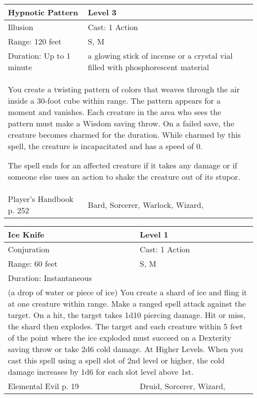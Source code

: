 \documentclass[11pt]{report}
\begin{document}
\begin{table}[H]
	\begin{tabular}{||p{6cm}|p{6cm}||}
		\hline\hline
		\bf{Hypnotic Pattern} & Level 3\\ \hline
		Illusion & Cast: 1 Action\\ \hline
		Range: 120 feet & S, M\\ \hline
		Duration: Up to 1 minute & a glowing stick of incense or a crystal vial filled with phosphorescent material\\ \hline
		\multicolumn{2}{||p{12cm}||}{You create a twisting pattern of colors that weaves through the air inside a 30-foot cube within range.
The pattern appears for a moment and vanishes. Each creature in the area who sees the pattern must make a Wisdom saving throw. On a failed save, the creature becomes charmed for the duration. While charmed by this spell, the creature is incapacitated and has a speed of 0.

The spell ends for an affected creature if it takes any damage or if someone else uses an action to shake the creature out of its stupor.}\\ \hline
Player's Handbook p. 252 & Bard, Sorcerer, Warlock, Wizard, \\ \hline\hline
	\end{tabular}
\end{table}

\begin{table}[H]
	\begin{tabular}{||p{6cm}|p{6cm}||}
		\hline\hline
		\bf{Ice Knife} & Level 1\\ \hline
		Conjuration & Cast: 1 Action\\ \hline
		Range: 60 feet & S, M\\ \hline
		Duration: Instantaneous & \\ \hline
		\multicolumn{2}{||p{12cm}||}{(a drop of water or piece of ice)
You create a shard of ice and fling it at one creature within range. Make a ranged spell attack against the target. On a hit, the target takes 1d10 piercing damage. Hit or miss, the shard then explodes. The target and each creature within 5 feet of the point where the ice exploded must succeed on a Dexterity saving throw or take 2d6 cold damage.
At Higher Levels. When you cast this spell using a spell slot of 2nd level or higher, the cold damage increases by 1d6 for each slot level above 1st.}\\ \hline
Elemental Evil p. 19 & Druid, Sorcerer, Wizard, \\ \hline\hline
	\end{tabular}
\end{table}
\end{document}
